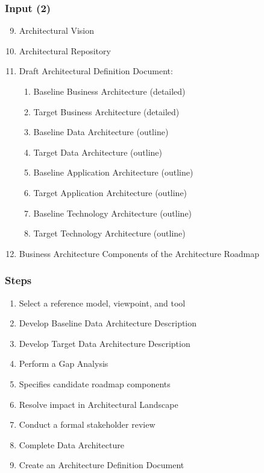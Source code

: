\documentclass[aspectratio=169, table]{beamer}
\begin{document}
    \begin{frame}
        \frametitle{Input (2)}
        \vspace{20pt}
        \begin{enumerate}
            \setcounter{enumi}{8}
            \item Architectural Vision
            \item Architectural Repository
            \item Draft Architectural Definition Document:
            \begin{enumerate}
                \item Baseline Business Architecture (detailed)
                \item Target Business Architecture (detailed)
                \item Baseline Data Architecture (outline)
                \item Target Data Architecture (outline)
                \item Baseline Application Architecture (outline)
                \item Target Application Architecture (outline)
                \item Baseline Technology Architecture (outline)
                \item Target Technology Architecture (outline)
            \end{enumerate}
            \item Business Architecture Components of the Architecture Roadmap
        \end{enumerate}
    \end{frame}


    \begin{frame}
        \frametitle{Steps}
        \vspace{20pt}
        \begin{enumerate}
            \item Select a reference model, viewpoint, and tool
            \item Develop Baseline Data Architecture Description
            \item Develop Target Data Architecture Description
            \item Perform a Gap Analysis
            \item Specifies candidate roadmap components
            \item Resolve impact in Architectural Landscape
            \item Conduct a formal stakeholder review
            \item Complete Data Architecture
            \item Create an Architecture Definition Document
        \end{enumerate}
    \end{frame}
\end{document}
